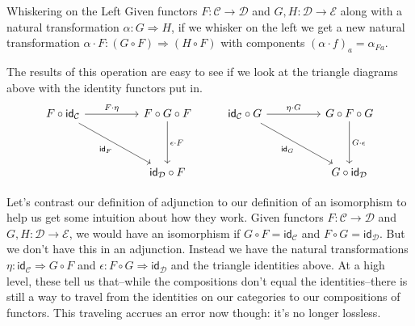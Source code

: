 \documentclass[12pt]{article}
\begin{document}
\begin{definition}{Whiskering on the Left}{}
    Given functors $F: \mathcal{C} \rightarrow \mathcal{D}$ and $G,H:\mathcal{D} \rightarrow \mathcal{E}$ along with a natural transformation $\alpha:G \Rightarrow H$, if we whisker on the left we get a new natural transformation $\alpha\cdot F : (G \circ F) \Rightarrow (H \circ F)$ with components $(\alpha\cdot f)_a=\alpha_{Fa}$.
\end{definition}
The results of this operation are easy to see if we look at the triangle diagrams above with the identity functors put in.
\[\begin{tikzcd}
        {F\circ \mathsf{id}_\mathcal{C}} && {F \circ G \circ F} & {\mathsf{id}_\mathcal{C} \circ G} && {G \circ F \circ G} \\
        \\
        && {\mathsf{id}_\mathcal{D} \circ F} &&& {G \circ \mathsf{id}_\mathcal{D}}
        \arrow["{F \cdot \eta}", from=1-1, to=1-3]
        \arrow["{\epsilon \cdot F}", from=1-3, to=3-3]
        \arrow["{\mathsf{id}_F}"', from=1-1, to=3-3]
        \arrow["{\eta \cdot G}", from=1-4, to=1-6]
        \arrow["{G \cdot \epsilon}", from=1-6, to=3-6]
        \arrow["{\mathsf{id}_G}"', from=1-4, to=3-6]
    \end{tikzcd}\]

Let's contrast our definition of adjunction to our definition of an isomorphism to help us get some intuition about how they work.
Given functors $F: \mathcal{C} \rightarrow \mathcal{D}$ and $G,H:\mathcal{D} \rightarrow \mathcal{E}$, we would have an isomorphism if $G \circ F = \mathsf{id}_\mathcal{C}$ and $F \circ G = \mathsf{id}_\mathcal{D}$.
But we don't have this in an adjunction.
Instead we have the natural transformations $\eta : \mathsf{id}_\mathcal{C} \Rightarrow G \circ F$ and $\epsilon: F \circ G \Rightarrow \mathsf{id}_\mathcal{D}$ and the triangle identities above.
At a high level, these tell us that--while the compositions don't equal the identities--there is still a way to travel from the identities on our categories to our compositions of functors.
This traveling accrues an error now though: it's no longer lossless.

\end{document}
